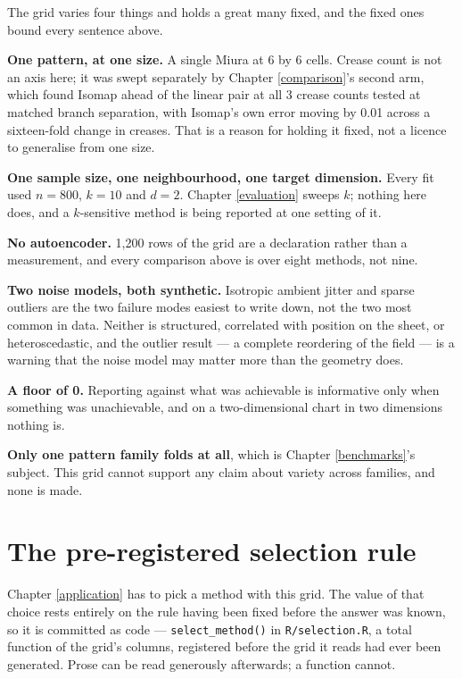\documentclass[
  british,
  a4paper,
]{book}
\newcounter{none} %
\begin{document}
The grid varies four things and holds a great many fixed, and the fixed ones
bound every sentence above.

\textbf{One pattern, at one size.} A single Miura at
6 by 6 cells. Crease count is not
an axis here; it was swept separately by Chapter \ref{comparison}'s second arm,
which found Isomap ahead of the linear pair at all
3 crease counts tested at matched branch
separation, with Isomap's own error moving by 0.01 across a
sixteen-fold change in creases. That is a reason for holding it fixed, not a
licence to generalise from one size.

\textbf{One sample size, one neighbourhood, one target dimension.} Every fit used
\(n = 800\), \(k = 10\) and \(d = 2\). Chapter
\ref{evaluation} sweeps \(k\); nothing here does, and a \(k\)-sensitive method
\citep{roweis2000lle} is being reported at one setting of it.

\textbf{No autoencoder.} 1,200 rows of the grid are a
declaration rather than a measurement, and every comparison above is over eight
methods, not nine.

\textbf{Two noise models, both synthetic.} Isotropic ambient jitter and sparse
outliers are the two failure modes easiest to write down, not the two most
common in data. Neither is structured, correlated with position on the sheet, or
heteroscedastic, and the outlier result --- a complete reordering of the field ---
is a warning that the noise model may matter more than the geometry does.

\textbf{A floor of 0.} Reporting against what was achievable is
informative only when something was unachievable, and on a two-dimensional chart
in two dimensions nothing is.

\textbf{Only one pattern family folds at all}, which is Chapter
\ref{benchmarks}'s subject. This grid cannot support any claim about variety
across families, and none is made.

\section{The pre-registered selection rule}\label{results-rule}

Chapter \ref{application} has to pick a method with this grid. The value of that
choice rests entirely on the rule having been fixed before the answer was known,
so it is committed as code --- \texttt{select\_method()} in \texttt{R/selection.R}, a total
function of the grid's columns, registered before the grid it reads had ever
been generated. Prose can be read generously afterwards; a function cannot.
\end{document}
